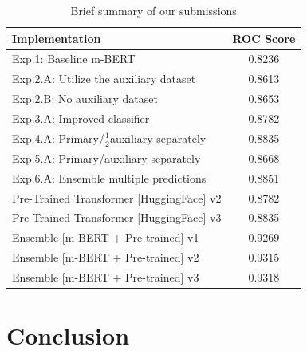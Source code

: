 \documentclass[10pt,twocolumn,letterpaper]{article}
\begin{document}
\begin{table}
\begin{center}
\begin{tabular}{|l|c|}
\hline
Implementation	& ROC Score \\
\hline\hline

Exp.1: Baseline m-BERT	& 0.8236    \\
Exp.2.A: Utilize the auxiliary dataset & 0.8613 \\
Exp.2.B: No auxiliary dataset	&0.8653 \\
Exp.3.A: Improved classifier & 0.8782 \\
Exp.4.A: Primary/$\frac{1}{2}$auxiliary separately & 0.8835 \\
Exp.5.A: Primary/auxiliary separately & 0.8668  \\
Exp.6.A: Ensemble multiple predictions & 0.8851 \\
Pre-Trained Transformer [HuggingFace] v2	&0.8782 \\
Pre-Trained Transformer [HuggingFace] v3	&0.8835  \\
Ensemble [m-BERT + Pre-trained] v1 	& 0.9269   \\
Ensemble [m-BERT + Pre-trained] v2 	& 0.9315   \\
Ensemble [m-BERT + Pre-trained] v3 	& 0.9318  \\

\hline
\end{tabular}
\end{center}
\caption{\label{ResultsSummary} Brief summary of our submissions}
\end{table}
\section{Conclusion}



{\small


}
\end{document}
